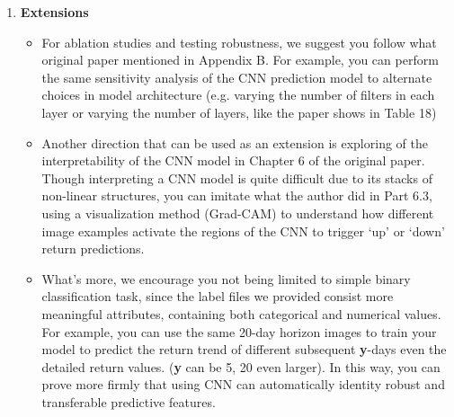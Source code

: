 \documentclass[11pt]{article}
\begin{document}
\begin{enumerate}
    
    \item \textbf{Extensions}
    
    \begin{itemize}
        \item For ablation studies and testing robustness, we suggest you follow what original paper mentioned in Appendix B. For example, you can perform the same sensitivity analysis of the CNN prediction model to alternate choices in model architecture (e.g. varying the number of filters in each layer or varying the number of layers, like the paper shows in Table 18) 
        
        \item Another direction that can be used as an extension is exploring of the interpretability of the CNN model in Chapter 6 of the original paper. Though interpreting a CNN model is quite difficult due to its stacks of non-linear structures, you can imitate what the author did in Part 6.3, using a visualization method (Grad-CAM) to understand how different image examples activate the regions of the CNN to trigger `up' or `down' return predictions.
        
        \item What's more, we encourage you not being limited to simple binary classification task, since the label files we provided consist more meaningful attributes, containing both categorical and numerical values. For example, you can use the same 20-day horizon images to train your model to predict the return trend of different subsequent \textbf{y}-days even the detailed return values. (\textbf{y} can be 5, 20 even larger). In this way, you can prove more firmly that using CNN can automatically identity robust and transferable predictive features.
    \end{itemize}

   
\end{enumerate}
\end{document}
